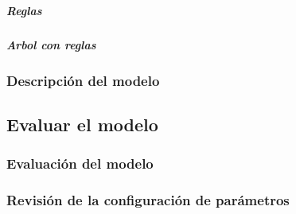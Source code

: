         \subparagraph{Reglas}
            

        \newpage
        \subparagraph{Arbol con reglas}

            \begin{figure}[ht]
            \end{figure}
            \FloatBarrier
            \newpage

    \subsubsection{Descripción del modelo}
\subsection{Evaluar el modelo}
    \subsubsection{Evaluación del modelo}
    \subsubsection{Revisión de la configuración de parámetros}
